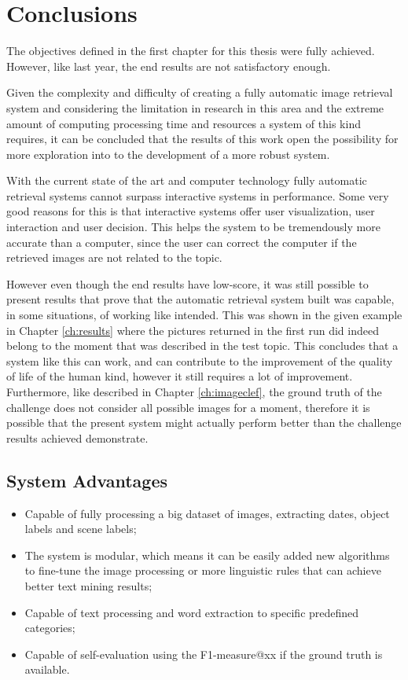 \cleardoublepage
\chapter{Conclusions}
\label{ch:conclusions}



The objectives defined in the first chapter for this thesis were fully achieved. However, like last year, the end results are not satisfactory enough.


Given the complexity and difficulty of creating a fully automatic image retrieval system and considering the limitation in research in this area and the extreme amount of computing processing time and resources a system of this kind requires, it can be concluded that the results of this work open the possibility for more exploration into to the development of a more robust system.


With the current state of the art and computer technology fully automatic retrieval systems cannot surpass interactive systems in performance. Some very good reasons for this is that interactive systems offer user visualization, user interaction and user decision. This helps the system to be tremendously more accurate than a computer, since the user can correct the computer if the retrieved images are not related to the topic.


However even though the end results have low-score, it was still possible to present results that prove that the automatic retrieval system built was capable, in some situations, of working like intended. This was shown in the given example in Chapter \ref{ch:results} where the pictures returned in the first run did indeed belong to the moment that was described in the test topic. This concludes that a system like this can work, and can contribute to the improvement of the quality of life of the human kind, however it still requires a lot of improvement. Furthermore, like described in Chapter \ref{ch:imageclef}, the ground truth of the challenge does not consider all possible images for a moment, therefore it is possible that the present system might actually perform better than the challenge results achieved demonstrate.



\section{System Advantages}

\begin{itemize}
    \itemsep0em
    \item Capable of fully processing a big dataset of images, extracting dates, object labels and scene labels;
    \item The system is modular, which means it can be easily added new algorithms to fine-tune the image processing or more linguistic rules that can achieve better text mining results;
    \item Capable of text processing and word extraction to specific predefined categories;
    \item Capable of self-evaluation using the F1-measure@xx if the ground truth is available.
\end{itemize}


